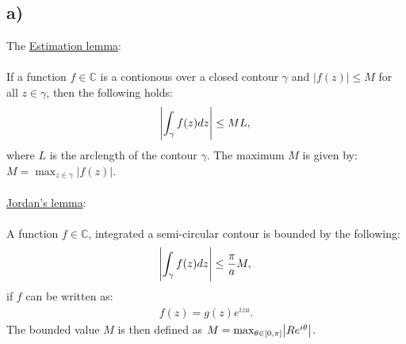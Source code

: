 \documentclass{article}
\begin{document}
\subsection*{a)}
The \underline{Estimation lemma}:\\\\\noindent
If a function $f\in\mathbb{C}$ is a contionous over a closed contour $\gamma$ and $|f(z)|\leq M$ for all $z\in\gamma$, then the following holds:
\begin{align*}
    \abs{\int_{\gamma}f(z)dz} \leq ML,
\end{align*}where $L$ is the arclength of the contour $\gamma$. The maximum $M$ is given by: $M = \max_{z\in\gamma}|f(z)|$.
\\\\\noindent
\underline{Jordan's lemma}:\\\\\noindent
A function $f\in\mathbb{C}$, integrated a semi-circular contour is bounded by the following:
\begin{align*}
    \abs{\int_\gamma f(z)dz} \leq \frac{\pi}{a}M,
\end{align*}if $f$ can be written as:
\begin{align*}
    f(z) = g(z)e^{iza}.
\end{align*}The bounded value $M$ is then defined as $M = \max_{\theta\in[0, \pi]}\abs{Re^{i\theta}}$.
\end{document}
